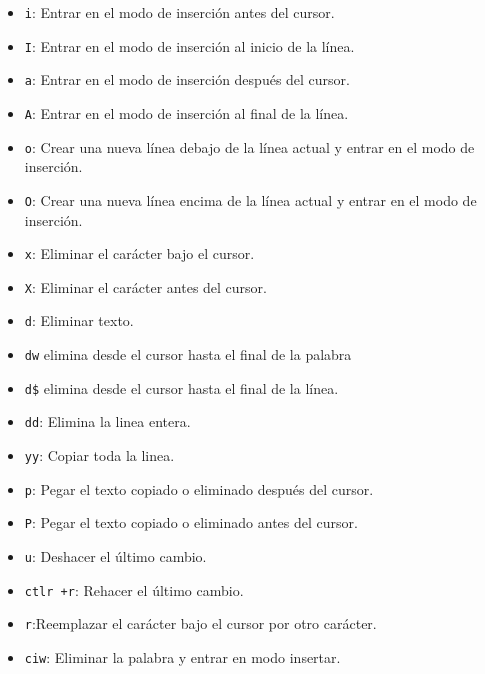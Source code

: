 \documentclass{article}[12pt,a4paper,twoside,utf8,spanish]
\theoremstyle{mytheoremstyle}
\theoremstyle{mytheoremstyle}
\theoremstyle{myproblemstyle}
\begin{document}
\begin{multicols}{2}
    \begin{itemize}
        \item \texttt{i}: Entrar en el modo de inserción antes del cursor.
        \item \texttt{I}: Entrar en el modo de inserción al inicio de la línea.
        \item \texttt{a}: Entrar en el modo de inserción después del cursor.
        \item \texttt{A}: Entrar en el modo de inserción al final de la línea.
        \item \texttt{o}: Crear una nueva línea debajo de la línea actual y entrar en el modo de inserción.
        \item \texttt{O}: Crear una nueva línea encima de la línea actual y entrar en el modo de inserción.
        \item \texttt{x}: Eliminar el carácter bajo el cursor.
        \item \texttt{X}: Eliminar el carácter antes del cursor.
        \item \texttt{d}: Eliminar texto.
        \item \texttt{dw} elimina desde el cursor hasta el final de la palabra
        \item \texttt{d\$} elimina desde el cursor hasta el final de la línea.
        \item \texttt{dd}: Elimina la linea  entera.  
        \item \texttt{yy}: Copiar toda la linea. 
        \item \texttt{p}: Pegar el texto copiado o eliminado después del cursor.
        \item \texttt{P}: Pegar el texto copiado o eliminado antes del cursor.
        \item \texttt{u}: Deshacer el último cambio.
        \item \texttt{ctlr +r}: Rehacer el último cambio.
        \item \texttt{r}:Reemplazar el carácter bajo el cursor por otro carácter.
        \item \texttt{ciw}: Eliminar la palabra y entrar en modo insertar. 
    \end{itemize}

\end{multicols}
\end{document}
